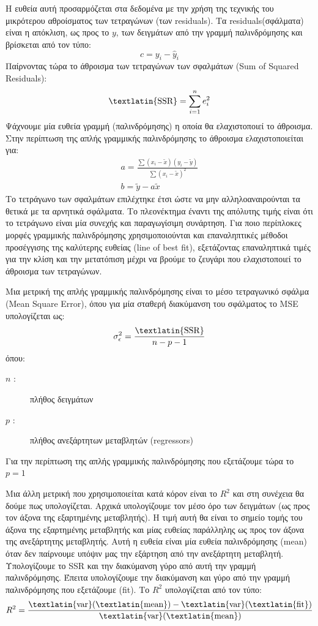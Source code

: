 Η ευθεία αυτή προσαρμόζεται στα δεδομένα με την χρήση της τεχνικής του μικρότερου
αθροίσματος των τετραγώνων (των \textlatin{residuals}). Τα \textlatin{residuals}(σφάλματα) είναι η απόκλιση, ως
προς το $y$, των δειγμάτων από την γραμμή παλινδρόμησης και βρίσκεται από τον τύπο:
$$c=y_i-\widehat{y}_i$$
Παίρνοντας τώρα το άθροισμα των τετραγώνων των σφαλμάτων (\textlatin{Sum of Squared Residuals}):
$$\text{\textlatin{SSR}}=\sum\limits_{i=1}^{n}e_i^2$$
Ψάχνουμε μία ευθεία γραμμή (παλινδρόμησης) η οποία θα ελαχιστοποιεί το άθροισμα. Στην
περίπτωση της απλής γραμμικής παλινδρόμησης το άθροισμα ελαχιστοποιείται για:
\begin{gather*}
    a=\frac{\sum(x_i-\widetilde{x})(y_i-\widetilde{y})}{\sum(x_i-\widetilde{x})^2} \\
    b=\widetilde{y}-a\widetilde{x}
\end{gather*}
Το τετράγωνο των σφαλμάτων επιλέχτηκε έτσι ώστε να μην αλληλοαναιρούνται τα θετικά με
τα αρνητικά σφάλματα. Το πλεονέκτημα έναντι της απόλυτης τιμής είναι ότι το τετράγωνο
είναι μία συνεχής και παραγωγίσιμη συνάρτηση. Για ποιο περίπλοκες μορφές γραμμικής
παλινδρόμησης χρησιμοποιούνται και επαναληπτικές μέθοδοι προσέγγισης της καλύτερης
ευθείας (\textlatin{line of best fit}), εξετάζοντας επαναληπτικά τιμές για την κλίση και την μετατόπιση
μέχρι να βρούμε το ζευγάρι που ελαχιστοποιεί το άθροισμα των τετραγώνων.

\sloppy
Μια μετρική της απλής γραμμικής παλινδρόμησης είναι το μέσο τετραγωνικό σφάλμα (\textlatin{Mean Square Error}),
όπου για μία σταθερή διακύμανση του σφάλματος το \textlatin{MSE} υπολογίζεται ως:
\fussy
$$\sigma_\epsilon^2=\frac{\text{\textlatin{SSR}}}{n-p-1}$$
όπου:
\begin{description}
    \item[$n$ :] πλήθος δειγμάτων
    \item[$p$ :] πλήθος ανεξάρτητων μεταβλητών (\textlatin{regressors})
\end{description}
Για την περίπτωση της απλής γραμμικής παλινδρόμησης που εξετάζουμε τώρα το $p=1$

Μια άλλη μετρική που χρησιμοποιείται κατά κόρον είναι το $R^2$ και στη συνέχεια θα δούμε πως υπολογίζεται.
Αρχικά υπολογίζουμε τον μέσο όρο των δειγμάτων (ως προς τον άξονα της εξαρτημένης
μεταβλητής). Η τιμή αυτή θα είναι το σημείο τομής του άξονα της εξαρτημένης μεταβλητής
και μίας ευθείας παράλληλης ως προς τον άξονα της ανεξάρτητης μεταβλητής. Αυτή η ευθεία
είναι μία ευθεία παλινδρόμησης (\textlatin{mean}) όταν δεν παίρνουμε υπόψιν μας την εξάρτηση από
την ανεξάρτητη μεταβλητή. Υπολογίζουμε το \textlatin{SSR} και την διακύμανση γύρο από αυτή την
γραμμή παλινδρόμησης. Έπειτα υπολογίζουμε την διακύμανση και γύρο από την γραμμή
παλινδρόμησης που εξετάζουμε (\textlatin{fit}). Το $R^2$ υπολογίζεται από τον τύπο:
$$R^2=\frac{\text{\textlatin{var}}(\text{\textlatin{mean}})-\text{\textlatin{var}}(\text{\textlatin{fit}})}{\text{\textlatin{var}}(\text{\textlatin{mean}})}$$

